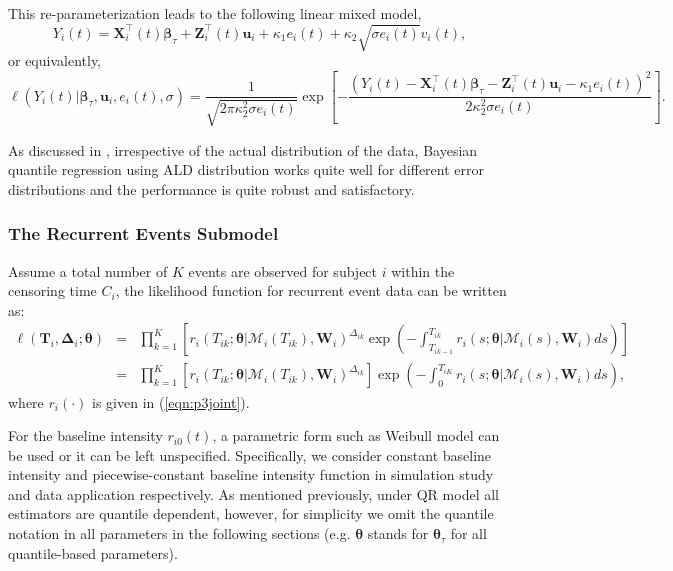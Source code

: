 This re-parameterization leads to the following linear mixed model,
\begin{equation*}\label{eqn:p3reformald2}
Y_{i}(t)={\boldsymbol X}_{i}^{\top}(t)\boldsymbol{\beta}_{\tau}+{\boldsymbol Z}_{i}^{\top}(t)\boldsymbol{u}_i+\kappa_1e_{i}(t)+\kappa_2\sqrt{\sigma e_{i}(t)}v_{i}(t),
\end{equation*}
\noindent or equivalently,
{\small
\begin{equation}\label{eqn:p3lo_sc_lh}
\ell(Y_{i}(t)|\boldsymbol{\beta}_{\tau},\boldsymbol{u}_i,e_{i}(t),\sigma)=\frac{1}{\sqrt{2\pi\kappa_2^2\sigma e_{i}(t)}}\exp\left[-\frac{(Y_{i}(t)-{\boldsymbol X}_{i}^{\top}(t)\boldsymbol{\beta}_{\tau}-{\boldsymbol Z}_{i}^{\top}(t)\boldsymbol{u}_i-\kappa_1e_{i}(t))^2}{2\kappa_2^2\sigma e_{i}(t)}\right].
\end{equation}
}


As discussed in \cite{yu2001bayesian}, irrespective of the actual distribution of the data, Bayesian quantile regression using ALD distribution works quite well for different error distributions and the performance is quite robust and satisfactory.




\subsubsection{The Recurrent Events Submodel}\label{sec:p3surv_submodel}
Assume a total number of $K$ events are observed for subject $i$ within the censoring time $C_i$, the likelihood function for recurrent event data can be written as:
\begin{eqnarray}\label{eqn:p3lik_sur}
\ell({\boldsymbol T}_i, \boldsymbol{\Delta}_i;\boldsymbol{\theta})&=& \nonumber \prod_{k=1}^{K}\left[r_i(T_{ik};\boldsymbol{\theta}|\mathcal{M}_{i}(T_{ik}), \boldsymbol{W}_i)^{\Delta_{ik}}\exp\left(-\int_{T_{ik-1}}^{T_{ik}}r_i(s;\boldsymbol{\theta}|\mathcal{M}_{i}(s), \boldsymbol{W}_i)ds\right)\right]\\
&=& \prod_{k=1}^{K}\left[r_i(T_{ik};\boldsymbol{\theta}|\mathcal{M}_{i}(T_{ik}), \boldsymbol{W}_i)^{\Delta_{ik}}\right]\exp\left(-\int_0^{T_{iK}}r_i(s;\boldsymbol{\theta}|\mathcal{M}_{i}(s), \boldsymbol{W}_i)ds\right),
\end{eqnarray}
\noindent where $r_i(\cdot)$ is given in (\ref{eqn:p3joint}).

For the baseline intensity $r_{i0}(t)$, a parametric form such as Weibull model can be used or it can be left unspecified. Specifically, we consider constant baseline intensity and piecewise-constant baseline intensity function in simulation study and data application respectively. As mentioned previously, under QR model all estimators are quantile dependent, however, for simplicity we omit the quantile notation in all parameters in the following sections (e.g. $\boldsymbol{\theta}$ stands for $\boldsymbol{\theta}_{\tau}$ for all quantile-based parameters).

